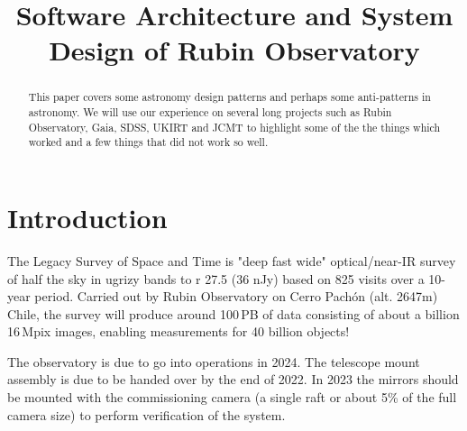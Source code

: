 \documentclass[11pt,twoside]{article}
\begin{document}

\title{Software Architecture and System Design of Rubin Observatory}







\begin{abstract}
This paper covers some astronomy design patterns and perhaps some anti-patterns in astronomy. We will use our experience on several long projects such as Rubin Observatory, Gaia, SDSS,  UKIRT and JCMT to highlight some of the the things which worked and a few things that did not work so well.
\end{abstract}

\section{Introduction}

The Legacy Survey of Space and Time \citep{2019ApJ...873..111I} is "deep fast wide" optical/near-IR survey of half the sky in ugrizy bands to r 27.5 (36 nJy) based on 825 visits over a 10-year period.
Carried out by Rubin Observatory on Cerro Pach\'{o}n (alt. 2647m) Chile, the survey will produce around 100\,PB of data consisting of about a billion 16\,Mpix images, enabling measurements for 40 billion objects!

The observatory is due to go into operations in 2024.
The telescope mount assembly is due to be handed over by the end of 2022.
In 2023 the mirrors should be mounted with the commissioning camera (a single raft or about 5\% of the full camera size) to perform verification of the system.
\end{document}
